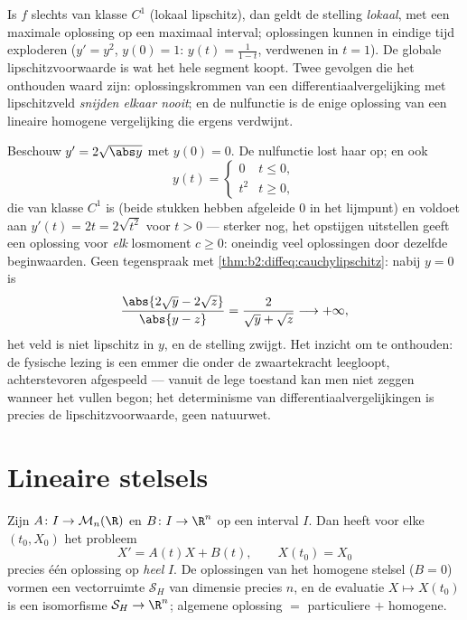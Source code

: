 \begin{remark}
Is $f$ slechts van klasse $C^1$ (lokaal lipschitz), dan geldt de
stelling \emph{lokaal}, met een maximale oplossing op een maximaal
 interval; oplossingen kunnen in eindige tijd exploderen ($y' =
y^2$, $y(0) = 1$: $y(t) = \frac{1}{1-t}$, verdwenen in $t = 1$). De
globale lipschitzvoorwaarde is wat het hele segment koopt. Twee
gevolgen die het onthouden waard zijn: oplossingskrommen van een
differentiaalvergelijking met lipschitzveld \emph{snijden elkaar
nooit}; en de nulfunctie is de enige oplossing van een lineaire
homogene vergelijking die ergens verdwijnt.
\end{remark}

\begin{example}\label{ex:b2:diffeq:leaky}
Beschouw $y' = 2\sqrt{\abs y}$ met $y(0) = 0$. De nulfunctie lost
haar op; en ook
\[
y(t) = \begin{cases} 0 & t \leq 0,\\ t^2 & t \geq 0,
\end{cases}
\]
die van klasse $C^1$ is (beide stukken hebben afgeleide $0$ in het
lijmpunt) en voldoet aan $y'(t) = 2t = 2\sqrt{t^2}$ voor $t > 0$
--- sterker nog, het opstijgen uitstellen geeft een oplossing voor
\emph{elk} losmoment $c \geq 0$: oneindig veel oplossingen door
dezelfde beginwaarden. Geen tegenspraak met
\cref{thm:b2:diffeq:cauchylipschitz}: nabij $y = 0$ is
\[
\frac{\abs{2\sqrt y - 2\sqrt z}}{\abs{y - z}}
= \frac{2}{\sqrt y + \sqrt z} \longrightarrow +\infty ,
\]
het veld is niet lipschitz in $y$, en de stelling zwijgt. Het
inzicht om te onthouden: de fysische lezing is een emmer die
onder de zwaartekracht leegloopt, achterstevoren afgespeeld ---
vanuit de lege toestand kan men niet zeggen wanneer het vullen
begon; het determinisme van differentiaalvergelijkingen is precies
de lipschitzvoorwaarde, geen natuurwet.
\end{example}

\section{Lineaire stelsels}

\begin{theorem}\label{thm:b2:diffeq:linear}
Zijn $A \colon I \to \mathcal{M}_n(\R)$ en $B \colon I \to \R^n$
 op een interval $I$. Dan heeft voor elke $(t_0, X_0)$ het
probleem
\[
X' = A(t)X + B(t), \qquad X(t_0) = X_0
\]
precies één oplossing op \emph{heel} $I$. De oplossingen van het
homogene stelsel ($B = 0$) vormen een vectorruimte $\mathcal{S}_H$
van dimensie precies $n$, en de evaluatie $X \mapsto X(t_0)$ is een
isomorfisme $\mathcal{S}_H \to \R^n$; algemene oplossing $=$
particuliere $+$ homogene.
\end{theorem}

